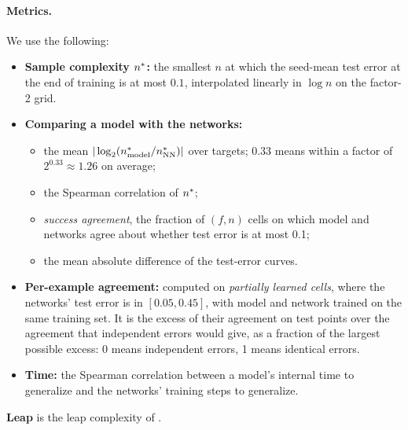 \paragraph{Metrics.} We use the following:
\begin{itemize}
\item \textbf{Sample complexity $n^{*}$:} the smallest $n$ at which the seed-mean test error at the end of training is at most $0.1$, interpolated linearly in $\log n$ on the factor-2 grid.
\item \textbf{Comparing a model with the networks:}
  \begin{itemize}
  \item the mean $|\log_2(n^{*}_{\rm model}/n^{*}_{\rm NN})|$ over targets; 0.33 means within a factor of $2^{0.33}\approx1.26$ on average;
  \item the Spearman correlation of $n^{*}$;
  \item \emph{success agreement}, the fraction of $(f,n)$ cells on which model and networks agree about whether test error is at most 0.1;
  \item the mean absolute difference of the test-error curves.
  \end{itemize}
\item \textbf{Per-example agreement:} computed on \emph{partially learned cells}, where the networks' test error is in $[0.05,0.45]$, with model and network trained on the same training set. It is the excess of their agreement on test points over the agreement that independent errors would give, as a fraction of the largest possible excess: 0 means independent errors, 1 means identical errors.
\item \textbf{Time:} the Spearman correlation between a model's internal time to generalize and the networks' training steps to generalize.
\end{itemize}
\textbf{Leap} is the leap complexity of \cite{abbe2023leap}.

